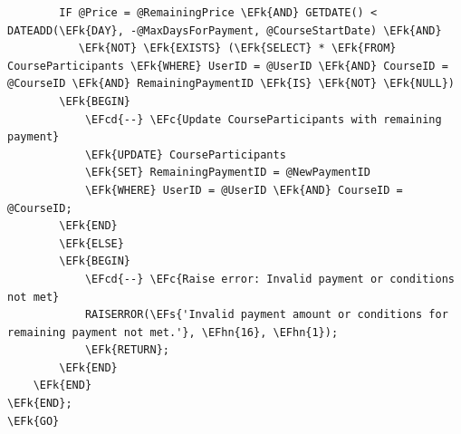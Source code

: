 \documentclass[11pt]{article}
\newcommand{\EFc}[1]{\textcolor{EFc}{\textit{#1}}} %
\newcommand{\EFcd}[1]{\textcolor{EFcd}{\textit{#1}}} %
\newcommand{\EFs}[1]{\textcolor{EFs}{#1}} %
\newcommand{\EFk}[1]{\textcolor{EFk}{\textbf{#1}}} %
\newcommand{\EFhn}[1]{\textcolor{EFhn}{#1}} %
\begin{document}
\begin{Code}
\begin{Verbatim}
        IF @Price = @RemainingPrice \EFk{AND} GETDATE() < DATEADD(\EFk{DAY}, -@MaxDaysForPayment, @CourseStartDate) \EFk{AND}
           \EFk{NOT} \EFk{EXISTS} (\EFk{SELECT} * \EFk{FROM} CourseParticipants \EFk{WHERE} UserID = @UserID \EFk{AND} CourseID = @CourseID \EFk{AND} RemainingPaymentID \EFk{IS} \EFk{NOT} \EFk{NULL})
        \EFk{BEGIN}
            \EFcd{--} \EFc{Update CourseParticipants with remaining payment}
            \EFk{UPDATE} CourseParticipants
            \EFk{SET} RemainingPaymentID = @NewPaymentID
            \EFk{WHERE} UserID = @UserID \EFk{AND} CourseID = @CourseID;
        \EFk{END}
        \EFk{ELSE}
        \EFk{BEGIN}
            \EFcd{--} \EFc{Raise error: Invalid payment or conditions not met}
            RAISERROR(\EFs{'Invalid payment amount or conditions for remaining payment not met.'}, \EFhn{16}, \EFhn{1});
            \EFk{RETURN};
        \EFk{END}
    \EFk{END}
\EFk{END};
\EFk{GO}
\end{Verbatim}
\end{Code}
\end{document}
